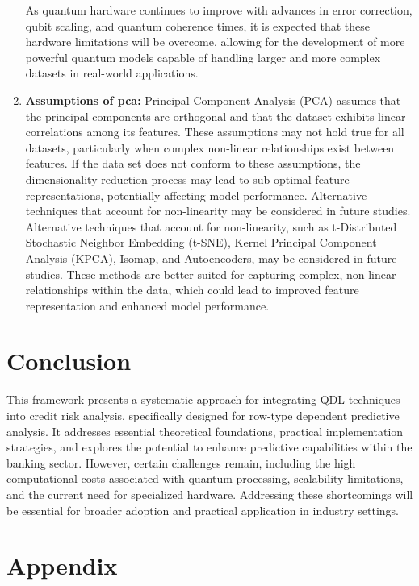 \documentclass[a4paper]{article}
\begin{document}
\begin{enumerate}
	As quantum hardware continues to improve with advances in error correction, qubit scaling, and quantum coherence times, it is expected that these hardware limitations will be overcome, allowing for the development of more powerful quantum models capable of handling larger and more complex datasets in real-world applications.
	
	
	\item[] \textbf{Assumptions of \gls{pca}:} Principal Component Analysis (PCA) assumes that the principal components are orthogonal and that the dataset exhibits linear correlations among its features. These assumptions may not hold true for all datasets, particularly when complex non-linear relationships exist between features. If the data set does not conform to these assumptions, the dimensionality reduction process may lead to sub-optimal feature representations, potentially affecting model performance. Alternative techniques that account for non-linearity may be considered in future studies. Alternative techniques that account for non-linearity, such as t-Distributed Stochastic Neighbor Embedding (t-SNE), Kernel Principal Component Analysis (KPCA), Isomap, and Autoencoders, may be considered in future studies. These methods are better suited for capturing complex, non-linear relationships within the data, which could lead to improved feature representation and enhanced model performance.
\end{enumerate}

\section{Conclusion}

This framework presents a systematic approach for integrating QDL techniques into credit risk analysis, specifically designed for row-type dependent predictive analysis. It addresses essential theoretical foundations, practical implementation strategies, and explores the potential to enhance predictive capabilities within the banking sector. However, certain challenges remain, including the high computational costs associated with quantum processing, scalability limitations, and the current need for specialized hardware. Addressing these shortcomings will be essential for broader adoption and practical application in industry settings.

\section*{Appendix}
\end{document}
